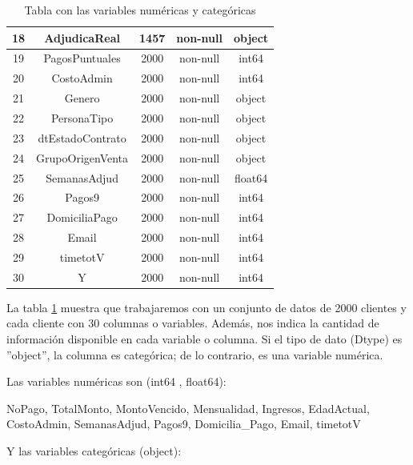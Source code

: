 \begin{table}[H]
\begin{tabular}{|c|c|c|c|c|}
        \hline
        \rowcolor{mediumgray}
        18 &  AdjudicaReal &        1457 & non-null &   object \\
        \hline
        19 &  PagosPuntuales &      2000 & non-null &   int64  \\
        \hline
        20 &  CostoAdmin &          2000 & non-null &   int64  \\
        \hline
        21 &  Genero &              2000 & non-null &   object \\
        \hline
        22 &  PersonaTipo &         2000 & non-null &   object \\
        \hline
        23 &  dtEstadoContrato &    2000 & non-null &   object \\
        \hline
        24 &  GrupoOrigenVenta &    2000 & non-null &   object \\
        \hline
        25 &  SemanasAdjud &        2000 & non-null &   float64 \\
        \hline
        26 &  Pagos9 &              2000 & non-null &   int64  \\
        \hline
        27 &  DomiciliaPago &      2000 & non-null &   int64  \\
        \hline
        28 &  Email &               2000 & non-null &   int64  \\
        \hline
        29 &  timetotV &            2000 & non-null &   int64  \\
        \hline
        30 &  Y &                   2000 & non-null &   int64 \\
        \hline  
    \end{tabular}
    \caption{Tabla con las variables numéricas y categóricas}
    \label{tab:vaxxx}
\end{table} \medskip

La tabla \ref{tab:vaxxx}  muestra que trabajaremos con un conjunto de datos de 2000 clientes y cada cliente con 30 columnas o variables. 
Además, nos indica la cantidad de información disponible en cada variable o columna. 
Si el tipo de dato (Dtype) es ''object'', la columna es categórica; de lo contrario, es una variable numérica.\medskip

Las variables numéricas son (int64 , float64):\medskip

NoPago, TotalMonto, MontoVencido, Mensualidad, Ingresos, EdadActual, CostoAdmin, SemanasAdjud,  Pagos9, Domicilia\_Pago, Email, timetotV \medskip

Y las variables categóricas (object):\medskip

